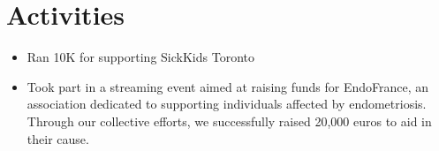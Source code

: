 \documentclass{article}
\begin{document}
\section*{Activities}
\begin{itemize}
  \item Ran 10K for supporting SickKids Toronto
  \item Took part in a streaming event aimed at raising funds for EndoFrance, an association dedicated to supporting individuals affected by endometriosis. Through our collective efforts, we successfully raised 20,000 euros to aid in their cause.
\end{itemize}
\end{document}
